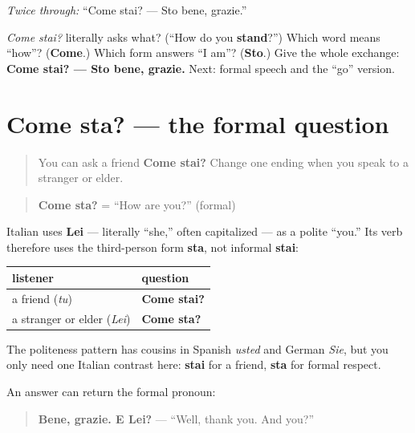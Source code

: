 \emph{Twice through:} “Come stai? — Sto bene, grazie.”

\begin{tcolorbox}[breakable,colback=teal!4,colframe=teal!35!black,title={Before you move on}]
\emph{Come stai?} literally asks what? (“How do you \textbf{stand}?”) Which word means “how”? (\textbf{Come}.) Which form answers “I am”? (\textbf{Sto}.) Give the whole exchange: \textbf{Come stai? — Sto bene, grazie.} Next: formal speech and the “go” version.
\end{tcolorbox}
\section[Come sta?]{Come sta? — the formal question}

\label{lesson:IT-C02-come-sta}



\begin{quote}
You can ask a friend \textbf{Come stai?} Change one ending when you speak to a stranger or elder.
\end{quote}

\begin{grammarlens}[title={Grammar Lens: stai and sta}]
\begin{quote}
\textbf{Come sta?} = “How are you?” (formal)
\end{quote}

Italian uses \textbf{Lei} — literally “she,” often capitalized — as a polite “you.” Its verb therefore uses the third-person form \textbf{sta}, not informal \textbf{stai}:

\noindent
\begin{tabularx}{\linewidth}{@{}>{\raggedright\arraybackslash}X>{\raggedright\arraybackslash}X@{}}
\toprule
\textbf{listener} & \textbf{question} \\
\midrule
a friend (\emph{tu}) & \textbf{Come stai?} \\
a stranger or elder (\emph{Lei}) & \textbf{Come sta?} \\
\bottomrule
\end{tabularx}

The politeness pattern has cousins in Spanish \emph{usted} and German \emph{Sie}, but you only need one Italian contrast here: \textbf{stai} for a friend, \textbf{sta} for formal respect.

An answer can return the formal pronoun:

\begin{quote}
\textbf{Bene, grazie. E Lei?} — “Well, thank you. And you?”
\end{quote}
\end{grammarlens}

